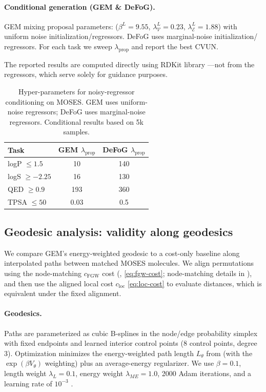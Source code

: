 \paragraph{Conditional generation (GEM \& DeFoG).}
GEM mixing proposal parameters:
($\beta^L=9.55$, $\lambda_{\mathcal{V}}^L=0.23$, $\lambda_{\mathcal{E}}^L=1.88$) with uniform noise initialization/regressors.
DeFoG uses marginal-noise initialization/ regressors. For each task we sweep $\lambda_{\text{prop}}$
and report the best CVUN.

The reported results are computed directly using RDKit library \cite{rdkit}—not from the regressors, which serve solely for guidance purposes.


\begin{table}[t]
\centering
\footnotesize
\setlength{\tabcolsep}{4pt}
\begin{tabular}{lcc}
\toprule
Task & GEM $\lambda_{\text{prop}}$ & DeFoG $\lambda_{\text{prop}}$ \\
\midrule
logP $\le 1.5$ & 10 & 140 \\
logS $\ge -2.25$ & 16 & 130 \\
QED $\ge 0.9$ & 193 & 360 \\
TPSA $\le 50$ & 0.03 & 0.5 \\
\bottomrule
\end{tabular}
\caption{\footnotesize Hyper-parameters for noisy-regressor conditioning on MOSES.
GEM uses uniform-noise regressors; DeFoG uses marginal-noise regressors. Conditional results based on 5k samples.}
\label{tab:cond-hparams}
\end{table}


\subsection{Geodesic analysis: validity along geodesics}
We compare GEM's energy-weighted geodesic to a cost-only baseline along interpolated paths between
matched MOSES molecules. We align permutations using the node-matching $c_{\mathrm{FGW}}$ cost
(, \eqref{eq:fgw-cost}; node-matching details in ),
and then use the aligned local cost $c_{\mathrm{loc}}$ \eqref{eq:loc-cost} to evaluate distances,
which is equivalent under the fixed alignment. 

\paragraph{Geodesics.}
Paths are parameterized as cubic B-splines in the
node/edge probability simplex with fixed endpoints and learned interior control points (8 control
points, degree 3). Optimization minimizes the energy-weighted path length $L_\theta$ from
 (with the $\exp(\beta V_\theta)$ weighting) plus an average-energy
regularizer. We use $\beta=0.1$, length weight $\lambda_L=0.1$, energy weight $\lambda_{ME}=1.0$,
2000 Adam iterations, and a learning rate of $10^{-3}$ \citep{kingma2014adam}.

